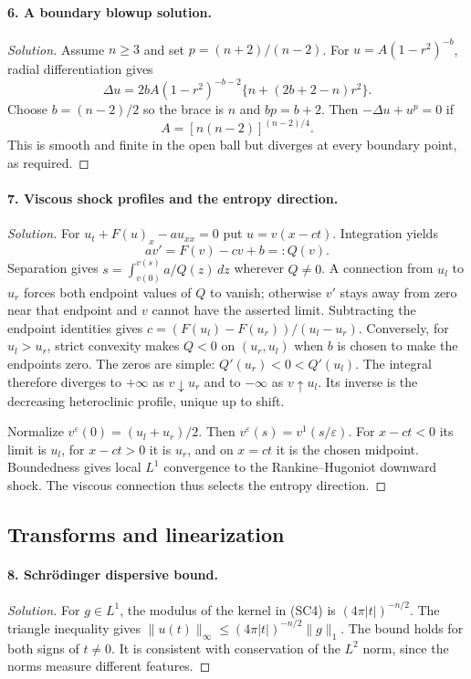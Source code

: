 \Needspace{30mm}
\paragraph{6. A boundary blowup solution.}
\begin{proof}[Solution]
Assume $n\geq3$ and set $p=(n+2)/(n-2)$.
For $u=A(1-r^2)^{-b}$, radial differentiation gives
\[
 \Delta u=2bA(1-r^2)^{-b-2}
                 \{n+(2b+2-n)r^2\}.
\]
Choose $b=(n-2)/2$ so the brace is $n$ and $bp=b+2$.
Then $-\Delta u+u^p=0$ if
\[
 A=[n(n-2)]^{(n-2)/4}.
\]
This is smooth and finite in the open ball but diverges at every
boundary point, as required.
\end{proof}

\Needspace{30mm}
\paragraph{7. Viscous shock profiles and the entropy direction.}
\begin{proof}[Solution]
For $u_t+F(u)_x-au_{xx}=0$ put $u=v(x-ct)$.
Integration yields
\[
 av'=F(v)-cv+b=:Q(v).
\]
Separation gives $s=\int_{v(0)}^{v(s)}a/Q(z)\,dz$ wherever $Q\ne0$.
A connection from $u_l$ to $u_r$ forces both endpoint values of $Q$
to vanish; otherwise $v'$ stays away from zero near that endpoint
and $v$ cannot have the asserted limit.
Subtracting the endpoint identities gives
$c=(F(u_l)-F(u_r))/(u_l-u_r)$.
Conversely, for $u_l>u_r$, strict convexity makes
$Q<0$ on $(u_r,u_l)$ when $b$ is chosen to make the endpoints zero.
The zeros are simple: $Q'(u_r)<0<Q'(u_l)$.
The integral therefore diverges to $+\infty$ as $v\downarrow u_r$
and to $-\infty$ as $v\uparrow u_l$.
Its inverse is the decreasing heteroclinic profile, unique up to shift.

Normalize $v^\varepsilon(0)=(u_l+u_r)/2$.
Then $v^\varepsilon(s)=v^1(s/\varepsilon)$.
For $x-ct<0$ its limit is $u_l$, for $x-ct>0$ it is $u_r$,
and on $x=ct$ it is the chosen midpoint.
Boundedness gives local $L^1$ convergence to the Rankine--Hugoniot
downward shock. The viscous connection thus selects the entropy direction.
\end{proof}

\Needspace{35mm}
\subsection{Transforms and linearization}
\Needspace{30mm}
\paragraph{8. Schr\"odinger dispersive bound.}
\begin{proof}[Solution]
For $g\in L^1$, the modulus of the kernel in (SC4) is
$(4\pi|t|)^{-n/2}$. The triangle inequality gives
$\|u(t)\|_\infty\leq(4\pi|t|)^{-n/2}\|g\|_1$.
The bound holds for both signs of $t\ne0$.
It is consistent with conservation of the $L^2$ norm, since the
norms measure different features.
\end{proof}

